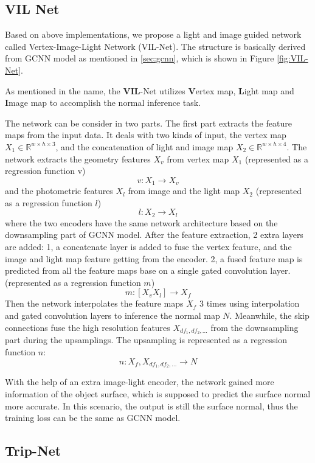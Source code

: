\subsection{VIL Net}
Based on above implementations, we propose a light and image guided network called Vertex-Image-Light Network (VIL-Net). The structure is basically derived from GCNN model as mentioned in \ref{sec:gcnn}, which is shown in Figure 
\ref{fig:VIL-Net}.

As mentioned in the name, the \textbf{VIL}-Net utilizes \textbf{V}ertex map, \textbf{L}ight map and \textbf{I}mage map to accomplish the normal inference task. 

The network can be consider in two parts. The first part extracts the feature maps from the input data. It deals with two kinds of input, the vertex map $ X_1 \in \mathbb{R}^{w\times h\times3}$, and the concatenation of light and image map $ X_2 \in \mathbb{R}^{w\times h\times4} $. The network extracts the geometry features $ X_v $ from vertex map $ X_1 $ (represented as a regression function v)
\[ v: X_1 \rightarrow X_v \]
and the photometric features $ X_l $ from image and the light map $ X_2 $ (represented as a regression function $ l $)
\[ l: X_2 \rightarrow X_l \]
where the two encoders have the same network architecture based on the downsampling part of GCNN model. After the feature extraction, 2 extra layers are added: 1, a concatenate layer is added to fuse the vertex feature, and the image and light map feature getting from the encoder. 
2, a fused feature map is predicted from all the feature maps base on a single gated convolution layer. (represented as a regression function $ m $)
\[ m: [X_v X_l] \rightarrow X_f \]
Then the network interpolates the feature maps $ X_f $ 3 times using interpolation and gated convolution layers to inference the normal map $ N $. Meanwhile, the skip connections fuse the high resolution features $ X_{df_1, df_2, ...} $ from the downsampling part during the upsamplings. The upsampling is represented as a regression function $ n $:
\[ n: X_f, X_{df_1, df_2, ...} \rightarrow N \]

With the help of an extra image-light encoder, the network gained more information of the object surface, which is supposed to predict the surface normal more accurate. In this scenario, the output is still the surface normal, thus the training loss can be the same as GCNN model.


\subsection{Trip-Net}


